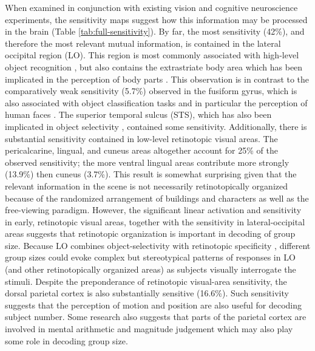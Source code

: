 \documentclass[5p,authoryear]{elsarticle}
\begin{document}
When examined in conjunction with existing vision and cognitive neuroscience experiments, the sensitivity maps suggest how this information may be processed in the brain (Table \ref{tab:full-sensitivity}).
By far, the most sensitivity (42\%), and therefore the most relevant mutual information, is contained in the lateral occipital region (LO).
This region is most commonly associated with high-level object recognition \citep{Grill-Spector2001}, but also contains the extrastriate body area which has been implicated in the perception of body parts \citep{Astafiev2004}.
This observation is in contrast to the comparatively weak sensitivity (5.7\%) observed in the fusiform gyrus, which is also associated with object classification tasks and in particular the perception of human faces \citep{Kanwisher1997,Sayres2010}.
The superior temporal sulcus (STS), which has also been implicated in object selectivity \citep{Hasselmo1989,Beauchamp2004}, contained some sensitivity. 
Additionally, there is substantial sensitivity contained in low-level retinotopic visual areas. 
The pericalcarine, lingual, and cuneus areas altogether account for 25\% of the observed sensitivity; the more ventral lingual areas contribute more strongly (13.9\%) then cuneus (3.7\%).
This result is somewhat surprising given that the relevant information in the scene is not necessarily retinotopically organized because of the randomized arrangement of buildings and characters as well as the free-viewing paradigm.
However, the significant linear activation and sensitivity in early, retinotopic visual areas, together with the sensitivity in lateral-occipital areas suggests that retinotopic organization is important in decoding of group size. 
Because LO combines object-selectivity with retinotopic specificity \citep{Sayres2008}, different group sizes could evoke complex but stereotypical patterns of responses in LO (and other retinotopically organized areas) as subjects visually interrogate the stimuli. 
Despite the preponderance of retinotopic visual-area sensitivity, the dorsal parietal cortex is also substantially sensitive (16.6\%).
Such sensitivity suggests that the perception of motion and position are also useful for decoding subject number.
Some research also suggests that parts of the parietal cortex are involved in mental arithmetic and magnitude judgement \citep{Rickard2000} which may also play some role in decoding group size.
\end{document}

